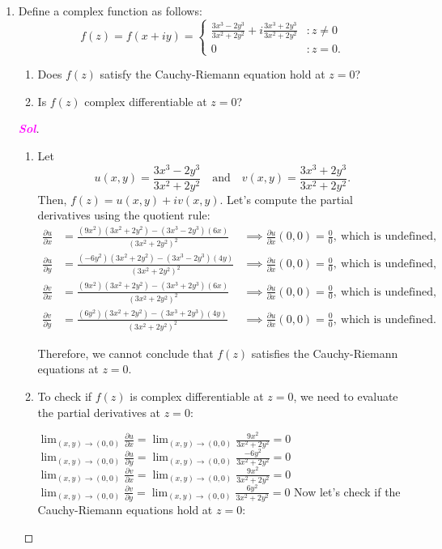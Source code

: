 \documentclass{article}
\theoremstyle{definition}
\newcommand{\of}[1]{\left( #1 \right)}
\newcommand{\sol}{\textcolor{magenta}{\bf Sol}}
\begin{document}
\begin{enumerate}
	\item Define a complex function as follows: \[
	f\of{z}=f\of{x+iy}=\begin{cases}
		\displaystyle\frac{3x^3-2y^3}{3x^2+2y^2}+i\frac{3x^3+2y^3}{3x^2+2y^2} &: z\neq 0\\
		0 &: z=0.
	\end{cases}
	\] \begin{enumerate}
		\item Does $f(z)$ satisfy the Cauchy-Riemann equation hold at $z=0$?
		\item Is $f(z)$ complex differentiable at $z=0$?
	\end{enumerate}
	\begin{proof}[\sol]
		\begin{enumerate}
			\item Let \[
			u(x, y) = \frac{3x^3 - 2y^3}{3x^2 + 2y^2}\quad\text{and}\quad v(x, y) = \frac{3x^3 + 2y^3}{3x^2 + 2y^2}.
			\] Then, $f(z) = u(x, y) + iv(x, y)$. Let's compute the partial derivatives using the quotient rule: \begin{align*}
				\frac{\partial u}{\partial x} &= \frac{(9x^2)(3x^2 + 2y^2) - (3x^3 - 2y^3)(6x)}{(3x^2 + 2y^2)^2} &\implies\frac{\partial u}{\partial x}\of{0,0}=\frac{0}{0},\ \text{which is undefined},\\
				\frac{\partial u}{\partial y} &= \frac{(-6y^2)(3x^2 + 2y^2) - (3x^3 - 2y^3)(4y)}{(3x^2 + 2y^2)^2}&\implies\frac{\partial u}{\partial x}\of{0,0}=\frac{0}{0},\ \text{which is undefined},\\
				\frac{\partial v}{\partial x} &= \frac{(9x^2)(3x^2 + 2y^2) - (3x^3 + 2y^3)(6x)}{(3x^2 + 2y^2)^2}&\implies\frac{\partial u}{\partial x}\of{0,0}=\frac{0}{0},\ \text{which is undefined},\\
				\frac{\partial v}{\partial y} &= \frac{(6y^2)(3x^2 + 2y^2) - (3x^3 + 2y^3)(4y)}{(3x^2 + 2y^2)^2}&\implies\frac{\partial u}{\partial x}\of{0,0}=\frac{0}{0},\ \text{which is undefined}.
			\end{align*}
			
			Therefore, we cannot conclude that $f(z)$ satisfies the Cauchy-Riemann equations at $z = 0$.
			
			\item To check if $f(z)$ is complex differentiable at $z = 0$, we need to evaluate the partial derivatives at $z = 0$:
			
			$\lim_{(x,y) \to (0,0)} \frac{\partial u}{\partial x} = \lim_{(x,y) \to (0,0)} \frac{9x^2}{3x^2 + 2y^2} = 0$
			$\lim_{(x,y) \to (0,0)} \frac{\partial u}{\partial y} = \lim_{(x,y) \to (0,0)} \frac{-6y^2}{3x^2 + 2y^2} = 0$
			$\lim_{(x,y) \to (0,0)} \frac{\partial v}{\partial x} = \lim_{(x,y) \to (0,0)} \frac{9x^2}{3x^2 + 2y^2} = 0$
			$\lim_{(x,y) \to (0,0)} \frac{\partial v}{\partial y} = \lim_{(x,y) \to (0,0)} \frac{6y^2}{3x^2 + 2y^2} = 0$
			Now let's check if the Cauchy-Riemann equations hold at $z = 0$:
			

\end{enumerate}
\end{proof}
\end{enumerate}
\end{document}
